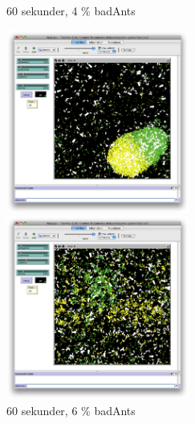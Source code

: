 \documentclass[titlepage, a4paper, 12pt]{article}
\begin{document}
\begin{figure}
  \begin{minipage}[b]{0.5\linewidth} %
    \centering
    \caption{60 sekunder, 4 \% badAnts}
    \includegraphics[width=6cm]{images/20-bad-60.png}
  \end{minipage}
  \hspace{0.5cm} %
  \begin{minipage}[b]{0.5\linewidth}
    \centering
    \caption{60 sekunder, 6 \% badAnts}
    \includegraphics[width=6cm]{images/30-bad-60.png}
  \end{minipage}
  

\end{figure}
\end{document}
